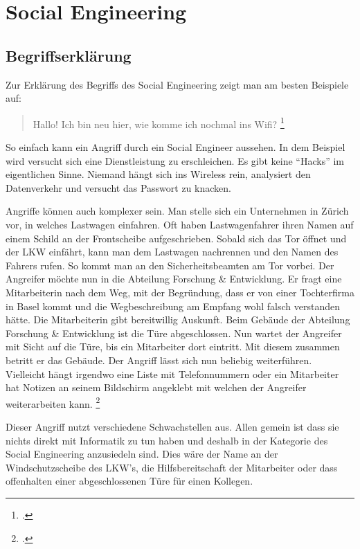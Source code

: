 

\chapter{Social Engineering}
\label{sec:socialengineering}

\section{Begriffserklärung}
\label{sec:socialengineering:begriffserklaerung}
Zur Erklärung des Begriffs des Social Engineering zeigt man am besten Beispiele auf:

\begin{quote}
	Hallo! Ich bin neu hier, wie komme ich nochmal ins Wifi? \footcite{Social_Engineering_Wenn_die_Gefahr_im_Anzug_kommt__t3n_2015-04-26}
\end{quote}

So einfach kann ein Angriff durch ein Social Engineer aussehen. In dem Beispiel wird versucht sich eine Dienstleistung zu erschleichen. Es gibt keine "`Hacks"' im eigentlichen Sinne. Niemand hängt sich ins Wireless rein, analysiert den Datenverkehr und versucht das Passwort zu knacken.

Angriffe können auch komplexer sein. Man stelle sich ein Unternehmen in Zürich vor, in welches Lastwagen einfahren. Oft haben Lastwagenfahrer ihren Namen auf einem Schild an der Frontscheibe aufgeschrieben. Sobald sich das Tor öffnet und der LKW einfährt, kann man dem Lastwagen nachrennen und den Namen des Fahrers rufen. So kommt man an den Sicherheitsbeamten am Tor vorbei. 
Der Angreifer möchte nun in die Abteilung Forschung \& Entwicklung. Er fragt eine Mitarbeiterin nach dem Weg, mit der Begründung, dass er von einer Tochterfirma in Basel kommt und die Wegbeschreibung am Empfang wohl falsch verstanden hätte. Die Mitarbeiterin gibt bereitwillig Auskunft.
Beim Gebäude der Abteilung Forschung \& Entwicklung ist die Türe abgeschlossen. Nun wartet der Angreifer mit Sicht auf die Türe, bis ein Mitarbeiter dort eintritt. Mit diesem zusammen betritt er das Gebäude. 
Der Angriff lässt sich nun beliebig weiterführen. Vielleicht hängt irgendwo eine Liste mit Telefonnummern oder ein Mitarbeiter hat Notizen an seinem Bildschirm angeklebt mit welchen der Angreifer weiterarbeiten kann. \footcite{Beispiel_fr_einen_Social_Engineering_Angriff_Social_Engineering_-_Manipulation_2015-04-26}

Dieser Angriff nutzt verschiedene Schwachstellen aus. Allen gemein ist dass sie nichts direkt mit Informatik zu tun haben und deshalb in der Kategorie des Social Engineering anzusiedeln sind. Dies wäre der Name an der Windschutzscheibe des LKW's, die Hilfsbereitschaft der Mitarbeiter oder dass offenhalten einer abgeschlossenen Türe für einen Kollegen.

